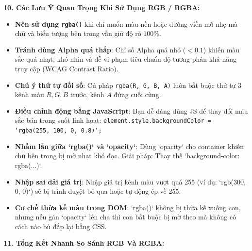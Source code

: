 \documentclass[11pt,oneside]{book}
\newcommand{\codeinline}[1]{\textcolor{accentOrange}{\texttt{#1}}}
\begin{document}
\textbf{10. Các Lưu Ý Quan Trọng Khi Sử Dụng RGB / RGBA:}

\begin{tipBox}
\begin{itemize}[leftmargin=1.5em, itemsep=3pt, parsep=0pt]
    \item \textbf{Nên sử dụng \codeinline{rgba()}} khi chỉ muốn màu nền hoặc đường viền mờ nhẹ mà chữ và biểu tượng bên trong vẫn giữ độ rõ $100\%$.
    \item \textbf{Tránh dùng Alpha quá thấp}: Chỉ số Alpha quá nhỏ ($< 0.1$) khiến màu sắc quá nhạt, khó nhìn và dễ vi phạm tiêu chuẩn độ tương phản khả năng truy cập (WCAG Contrast Ratio).
    \item \textbf{Chú ý thứ tự đối số}: Cú pháp \codeinline{rgba(R, G, B, A)} luôn bắt buộc thứ tự 3 kênh màu $R, G, B$ trước, kênh $A$ đứng cuối cùng.
    \item \textbf{Điều chỉnh động bằng JavaScript}: Bạn dễ dàng dùng JS để thay đổi màu sắc bán trong suốt linh hoạt:
    \codeinline{element.style.backgroundColor = `rgba(255, 100, 0, 0.8)`;}
\end{itemize}
\end{tipBox}

\begin{warnBox}
\begin{itemize}[leftmargin=1.5em, itemsep=3pt, parsep=0pt]
    \item \textbf{Nhầm lẫn giữa `rgba()` và `opacity`}: Dùng `opacity` cho container khiến chữ bên trong bị mờ nhạt khó đọc. Giải pháp: Thay thế `background-color: rgba(...)`.
    \item \textbf{Nhập sai dải giá trị}: Nhập giá trị kênh màu vượt quá 255 (ví dụ: `rgb(300, 0, 0)`) sẽ bị trình duyệt bỏ qua hoặc tự động ép về 255.
    \item \textbf{Cơ chế thừa kế màu trong DOM}: `rgba()` không bị thừa kế xuống con, nhưng nếu gán `opacity` lên cha thì con bắt buộc bị mờ theo mà không có cách nào bù đắp lại bằng CSS.
\end{itemize}
\end{warnBox}

\textbf{11. Tổng Kết Nhanh So Sánh RGB Và RGBA:}
\end{document}

